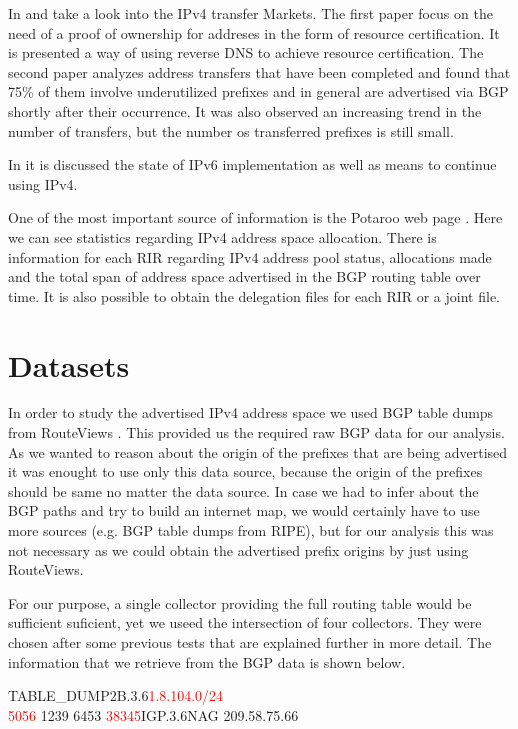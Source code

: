 \documentclass[11pt,a4paper]{scrreprt}
\begin{document}
In \cite{Land_Grab} and  \cite{IPv4_Transfer_Markets} take a look into the IPv4 transfer Markets. The first paper focus on the need of a proof of ownership for addreses in the form of resource certification. It is presented a way of using reverse DNS to achieve resource certification. The second paper analyzes address transfers that have been completed and found that 75\% of them involve underutilized prefixes and in general are advertised via BGP shortly after their occurrence. It was also observed an increasing trend in the number of transfers, but the number os transferred prefixes is still small.

In \cite{IPv6_state} it is discussed the state of IPv6 implementation as well as means to continue using IPv4.

One of the most important source of information is the Potaroo web page \cite{Potaroo}. 
Here we can see statistics regarding IPv4 address space allocation. There is information for each RIR regarding IPv4 address pool status, allocations made and the total span of address space advertised in the BGP routing table over time. It is also possible to obtain the delegation files for each RIR or a joint file.


\chapter{Datasets}

In order to study the advertised IPv4 address space we used BGP table dumps from RouteViews \cite{RouteViews}. This provided us the required raw BGP data for our analysis. As we wanted to reason about the origin of the prefixes that are being advertised it was enought to use only this data source, because the origin of the prefixes should be same no matter the data source. In case we had to infer about the BGP paths and try to build an internet map, we would certainly have to use more sources (e.g. BGP table dumps from RIPE), but for our analysis this was not necessary as we could obtain the advertised prefix origins by just using RouteViews.

For our purpose, a single collector providing the full routing table would be sufficient suficient, yet we useed the intersection of four collectors. They were chosen after some previous tests that are explained further in more detail.
The information that we retrieve from the BGP data is shown below. 
\vspace{5mm}

\hspace{1cm} TABLE\_DUMP2\textbar B.3.6\textbar \textcolor{red}{1.8.104.0/24}\textbar \\ \textcolor{red}{5056} 1239 6453 \textcolor{red}{38345}\textbar  IGP.3.6\textbar \textbar NAG 209.58.75.66\textbar
\end{document}
